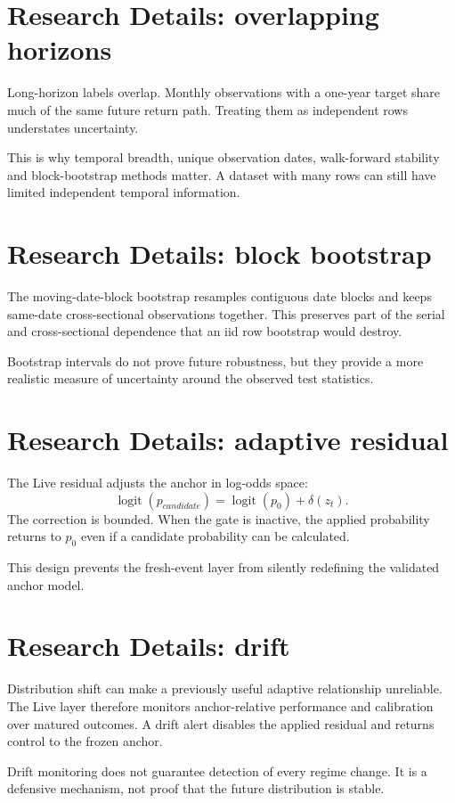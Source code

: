 \documentclass[11pt]{article}
\newcommand{\logit}{\operatorname{logit}}
\begin{document}
\section{Research Details: overlapping horizons}
Long-horizon labels overlap. Monthly observations with a one-year target share much of the same future return path. Treating them as independent rows understates uncertainty.

This is why temporal breadth, unique observation dates, walk-forward stability and block-bootstrap methods matter. A dataset with many rows can still have limited independent temporal information.

\section{Research Details: block bootstrap}
The moving-date-block bootstrap resamples contiguous date blocks and keeps same-date cross-sectional observations together. This preserves part of the serial and cross-sectional dependence that an iid row bootstrap would destroy.

Bootstrap intervals do not prove future robustness, but they provide a more realistic measure of uncertainty around the observed test statistics.

\section{Research Details: adaptive residual}
The Live residual adjusts the anchor in log-odds space:
\begin{equation}
\logit(p_{candidate})=\logit(p_0)+\delta(z_t).
\end{equation}
The correction is bounded. When the gate is inactive, the applied probability returns to $p_0$ even if a candidate probability can be calculated.

This design prevents the fresh-event layer from silently redefining the validated anchor model.

\section{Research Details: drift}
Distribution shift can make a previously useful adaptive relationship unreliable. The Live layer therefore monitors anchor-relative performance and calibration over matured outcomes. A drift alert disables the applied residual and returns control to the frozen anchor.

Drift monitoring does not guarantee detection of every regime change. It is a defensive mechanism, not proof that the future distribution is stable.
\end{document}
